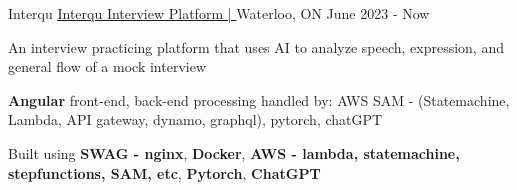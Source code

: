 \begin{cventries}
	\cventry
	{Interqu}  %
	{\underline{\href{https://interqu.com}{Interqu Interview Platform | \ExternalLink}}} %
	{Waterloo, ON} %
	{June 2023 - Now} %
	{
		\begin{cvitems} %
			\item {An interview practicing platform that uses AI to analyze speech, expression, and general flow of a mock interview}
      \item {\textbf{Angular} front-end, back-end processing handled by: AWS SAM - (Statemachine, Lambda, API gateway, dynamo, graphql), pytorch, chatGPT}
			\item {Built using \textbf{SWAG - nginx}, \textbf{Docker}, \textbf{AWS - lambda, statemachine, stepfunctions, SAM, etc}, \textbf{Pytorch}, \textbf{ChatGPT}}
		\end{cvitems}
	}




\end{cventries}
